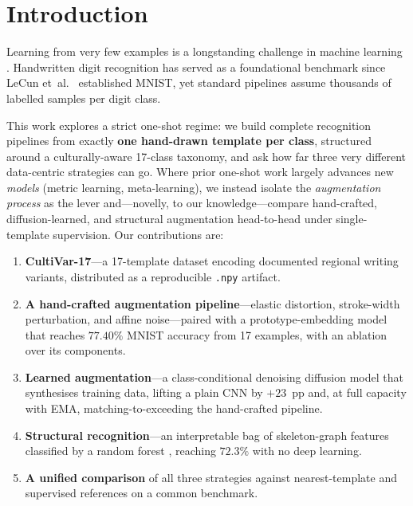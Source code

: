 \documentclass[final,5p,times,twocolumn]{elsarticle}
\begin{document}
\section{Introduction}

Learning from very few examples is a longstanding challenge in machine learning
\cite{Koch2015,Vinyals2016,Snell2017}.
Handwritten digit recognition has served as a foundational benchmark since LeCun
et~al.\ \cite{LeCun1998} established MNIST, yet standard pipelines assume thousands of
labelled samples per digit class.

This work explores a strict one-shot regime: we build complete recognition pipelines from
exactly \textbf{one hand-drawn template per class}, structured around a culturally-aware
17-class taxonomy, and ask how far three very different data-centric strategies can go.
Where prior one-shot work largely advances new \emph{models} (metric learning, meta-learning),
we instead isolate the \emph{augmentation process} as the lever and—novelly, to our
knowledge—compare hand-crafted, diffusion-learned, and structural augmentation head-to-head
under single-template supervision.
Our contributions are:

\begin{enumerate}
  \item \textbf{CultiVar-17}—a 17-template dataset encoding documented regional writing
        variants, distributed as a reproducible \texttt{.npy} artifact.
  \item \textbf{A hand-crafted augmentation pipeline}—elastic distortion, stroke-width
        perturbation, and affine noise—paired with a prototype-embedding model that reaches
        $77.40\%$ MNIST accuracy from 17 examples, with an ablation over its components.
  \item \textbf{Learned augmentation}—a class-conditional denoising diffusion model
        \cite{Ho2020} that synthesises training data, lifting a plain CNN by $+23$~pp and,
        at full capacity with EMA, matching-to-exceeding the hand-crafted pipeline.
  \item \textbf{Structural recognition}—an interpretable bag of skeleton-graph features
        classified by a random forest \cite{Breiman2001}, reaching $72.3\%$ with no deep
        learning.
  \item \textbf{A unified comparison} of all three strategies against nearest-template and
        supervised references on a common benchmark.
\end{enumerate}
\end{document}
